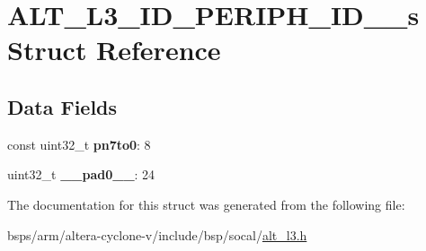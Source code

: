 \hypertarget{structALT__L3__ID__PERIPH__ID__0__s}{}\section{A\+L\+T\+\_\+\+L3\+\_\+\+I\+D\+\_\+\+P\+E\+R\+I\+P\+H\+\_\+\+I\+D\+\_\+\_\+s Struct Reference}
\label{structALT__L3__ID__PERIPH__ID__0__s}
\subsection*{Data Fields}
\begin{DoxyCompactItemize}
\item 
\mbox{\label{structALT__L3__ID__PERIPH__ID__0__s_a12e1a82c7a691a4ab5bfecd79ffda048}} 
const uint32\+\_\+t {\bfseries pn7to0}\+: 8
\item 
\mbox{\label{structALT__L3__ID__PERIPH__ID__0__s_ac6d4d217c7a77e7e385a10d04471abd9}} 
uint32\+\_\+t {\bfseries \+\_\+\+\_\+pad0\+\_\+\+\_\+}\+: 24
\end{DoxyCompactItemize}


The documentation for this struct was generated from the following file\+:\begin{DoxyCompactItemize}
\item 
bsps/arm/altera-\/cyclone-\/v/include/bsp/socal/\mbox{\hyperlink{alt__l3_8h}{alt\+\_\+l3.\+h}}\end{DoxyCompactItemize}
